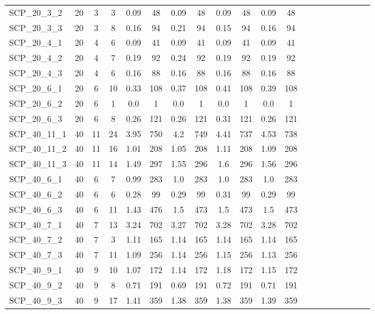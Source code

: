 \begin{sidewaystable}[!ht]
{\begin{tabular}{lccccccccccccccccccc}
SCP\_20\_3\_2 & 20 & 3 & 3 & 0.09 & 48 & 0.09 & 48 & 0.09 & 48 & 0.09 & 48 \\
SCP\_20\_3\_3 & 20 & 3 & 8 & 0.16 & 94 & 0.21 & 94 & 0.15 & 94 & 0.16 & 94 \\
SCP\_20\_4\_1 & 20 & 4 & 6 & 0.09 & 41 & 0.09 & 41 & 0.09 & 41 & 0.09 & 41 \\
SCP\_20\_4\_2 & 20 & 4 & 7 & 0.19 & 92 & 0.24 & 92 & 0.19 & 92 & 0.19 & 92 \\
SCP\_20\_4\_3 & 20 & 4 & 6 &  \textcolor{blue2}{0.16} & 88 &  \textcolor{blue2}{0.16} & 88 &  \textcolor{blue2}{0.16} & 88 &  \textcolor{blue2}{0.16} & 88 \\
SCP\_20\_6\_1 & 20 & 6 & 10 & 0.33 & 108 & 0.37 & 108 & 0.41 & 108 & 0.39 & 108 \\
SCP\_20\_6\_2 & 20 & 6 & 1 &  \textcolor{blue2}{0.0} & 1 &  \textcolor{blue2}{0.0} & 1 &  \textcolor{blue2}{0.0} & 1 &  \textcolor{blue2}{0.0} & 1 \\
SCP\_20\_6\_3 & 20 & 6 & 8 & 0.26 & 121 & 0.26 & 121 & 0.31 & 121 & 0.26 & 121 \\
SCP\_40\_11\_1 & 40 & 11 & 24 & 3.95 & 750 & 4.2 & 749 & 4.41 & 737 & 4.53 & 738 \\
SCP\_40\_11\_2 & 40 & 11 & 16 & 1.01 & 208 & 1.05 & 208 & 1.11 & 208 & 1.09 & 208 \\
SCP\_40\_11\_3 & 40 & 11 & 14 & 1.49 & 297 & 1.55 & 296 & 1.6 & 296 & 1.56 & 296 \\
SCP\_40\_6\_1 & 40 & 6 & 7 &  \textcolor{blue2}{0.99} & 283 & 1.0 & 283 & 1.0 & 283 & 1.0 & 283 \\
SCP\_40\_6\_2 & 40 & 6 & 6 & 0.28 & 99 & 0.29 & 99 & 0.31 & 99 & 0.29 & 99 \\
SCP\_40\_6\_3 & 40 & 6 & 11 & 1.43 & 476 & 1.5 & 473 & 1.5 & 473 & 1.5 & 473 \\
SCP\_40\_7\_1 & 40 & 7 & 13 & 3.24 & 702 & 3.27 & 702 & 3.28 & 702 & 3.28 & 702 \\
SCP\_40\_7\_2 & 40 & 7 & 3 & 1.11 & 165 & 1.14 & 165 & 1.14 & 165 & 1.14 & 165 \\
SCP\_40\_7\_3 & 40 & 7 & 11 & 1.09 & 256 & 1.14 & 256 & 1.15 & 256 & 1.13 & 256 \\
SCP\_40\_9\_1 & 40 & 9 & 10 & 1.07 & 172 & 1.14 & 172 & 1.18 & 172 & 1.15 & 172 \\
SCP\_40\_9\_2 & 40 & 9 & 8 & 0.71 & 191 & 0.69 & 191 & 0.72 & 191 & 0.71 & 191 \\
SCP\_40\_9\_3 & 40 & 9 & 17 & 1.41 & 359 &  \textcolor{blue2}{1.38} & 359 &  \textcolor{blue2}{1.38} & 359 & 1.39 & 359 \\

\end{tabular}}
\end{sidewaystable}
